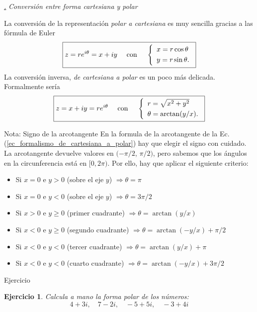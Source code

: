 \documentclass[a4paper,11pt]{book} %
\newtheorem{ejercicio_contador}{Ejercicio}
\newcommand{\Ejercicio}[1]{
		\begin{mybox_gray}{Ejercicio} 
			\begin{ejercicio_contador}
				 #1 
			\end{ejercicio_contador} 
		\end{mybox_gray}
	}
\numberwithin{equation}{chapter}
\def\subsubiContadorIt{\par\addtocounter{subsubsection}{1}\underline{\it\thesubsubsection.}\hskip0.5cm \setcounter{subsubsubsectionIt}{0}}
\newcommand{\SubsubiIt}[1]{
		\subsubiContadorIt \textit{#1}
	}
\newcounter{subsubsubsectionIt}[subsubsection]
\begin{document}
		
			\SubsubiIt{Conversión entre forma cartesiana y polar}

La conversión de la representación \textit{polar a cartesiana} es muy sencilla gracias a las fórmula de Euler
	\begin{equation}
	\boxed{z = r e^{i\theta} = x + i y ~~~\hbox{ con }  ~~~\left\{\begin{array}{l} x=r \cos \theta \\ \rule{0mm}{4mm} y = r\sin \theta . \end{array} \right. }
	\end{equation}
La conversión inversa, \textit{de cartesiana a polar} es un poco más delicada. Formalmente sería
	\begin{equation} \label{ec_formalismo_de_cartesiana_a_polar}
	\boxed{z = x + i y  = r e^{i\theta} ~~~ \hbox{ con } ~~~ \left\{\begin{array}{l} r=\sqrt{x^2+y^2} \\  \rule{0mm}{4mm} \theta = \arctan(y/x) . \end{array} \right.} 
	\end{equation}

	\begin{mybox_blue}{Nota: Signo de la arcotangente}
	En la formula de la arcotangente de la Ec. (\ref{ec_formalismo_de_cartesiana_a_polar}) hay que elegir el signo con cuidado. La arcotangente devuelve valores en $(-\pi/2$, $\pi/2)$, pero sabemos que los ángulos en la circunferencia está en  $[0,2\pi)$. Por ello, hay que aplicar el siguiente criterio:
	\begin{itemize}
		\item Si $x=0$ e $y>0$ (sobre el eje $y$) $\Rightarrow \theta = \pi$
		\item Si $x=0$ e $y<0$ (sobre el eje $y$) $ \Rightarrow \theta = 3\pi/2$
		\item Si $x>0$ e $y \geq 0$ (primer cuadrante) $ \Rightarrow \theta = \arctan (y/x)$
		\item Si $x<0$ e $y \geq 0$ (segundo cuadrante) $ \Rightarrow \theta = \arctan (-y/x) + \pi/2$
		\item Si $x<0$ e $y<0$ (tercer cuadrante) $ \Rightarrow \theta = \arctan (y/x) + \pi$
		\item Si $x<0$ e $y<0$ (cuarto cuadrante) $ \Rightarrow \theta = \arctan (-y/x) + 3\pi/2$
	\end{itemize}
	\end{mybox_blue}

	\Ejercicio{Calcula a mano la forma polar de los números: 
	$$
	4 + 3i, \quad 7 - 2i, \quad - 5 + 5i, \quad - 3 + 4i
	$$}
			
\end{document}
